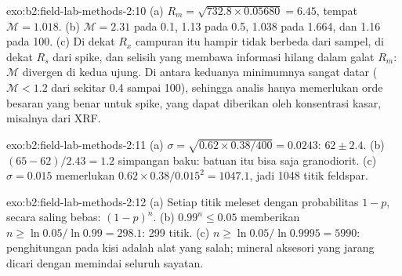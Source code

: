\begin{solution}{exo:b2:field-lab-methods-2:10}
(a) $R_m = \sqrt{732.8 \times 0.05680} = 6.45$, tempat $\mathcal M = 1.018$. (b) $\mathcal M = 2.31$
pada 0.1, 1.13 pada 0.5, 1.038 pada 1.664, dan 1.16 pada 100. (c) Di dekat $R_x$ campuran itu hampir tidak berbeda dari
sampel, di dekat $R_s$ dari spike, dan selisih yang membawa informasi hilang dalam
galat $R_m$: $\mathcal M$ divergen di kedua ujung. Di antara keduanya minimumnya sangat datar
($\mathcal M < 1.2$ dari sekitar 0.4 sampai 100), sehingga analis hanya memerlukan orde besaran yang benar
untuk spike, yang dapat diberikan oleh konsentrasi kasar, misalnya dari XRF.
\end{solution}

\begin{solution}{exo:b2:field-lab-methods-2:11}
(a) $\sigma = \sqrt{0.62 \times 0.38/400} = 0.0243$: $62 \pm 2.4$. (b) $(65 - 62)/2.43 = 1.2$
simpangan baku: batuan itu bisa saja granodiorit. (c) $\sigma = 0.015$ memerlukan $0.62 \times
0.38/0.015^2 = 1047.1$, jadi 1048 titik feldspar.
\end{solution}

\begin{solution}{exo:b2:field-lab-methods-2:12}
(a) Setiap titik meleset dengan probabilitas $1 - p$, secara saling bebas: $(1-p)^n$. (b) $0.99^n \le 0.05$
memberikan $n \ge \ln 0.05/\ln 0.99 = 298.1$: 299 titik. (c) $n \ge \ln 0.05/\ln 0.9995 = 5990$: penghitungan
pada kisi adalah alat yang salah; mineral aksesori yang jarang dicari dengan memindai seluruh sayatan.
\end{solution}

